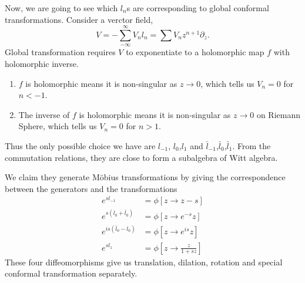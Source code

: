 \documentclass[a4paper,11pt]{article}
\begin{document}
Now, we are going to see which $l_n$s are corresponding to global conformal transformations. Consider a verctor field,
\begin{equation}
    V=-\sum_{-\infty}^\infty V_nl_n=\sum V_nz^{n+1}\partial_z.
\end{equation}
 Global transformation requires $V$ to exponentiate to a holomorphic map $f$ with holomorphic inverse.
 \begin{enumerate}
     \item $f$ is holomorphic means it is non-singular as $z\rightarrow0$, which tells us $V_n=0$ for $n<-1$.
     \item The inverse of $f$ is holomorphic means it is non-singular as $z\rightarrow0$ on Riemann Sphere, which tells us $V_n=0$ for $n>1$.
 \end{enumerate}
Thus the only possible choice we have are $l_{-1}$, $l_0$,$l_1$ and $\bar{l}_{-1}$,$\bar{l}_0$,$\bar{l}_1$. From the commutation relations, they are close to form a subalgebra of Witt algebra.

We claim they generate Möbius transformations by giving the correspondence between the generators and the transformations
\begin{equation*}
\begin{aligned}
e^{sl_{-1}}&=\phi[z\rightarrow z-s]\\
e^{s(l_0+\bar{l}_0)}&=\phi[z\rightarrow e^{-s}z]\\
e^{is(\bar{l}_0-l_0)}&=\phi[z\rightarrow e^{is}z]\\
e^{sl_1}&=\phi[z\rightarrow \frac{z}{1+sz}]
\end{aligned}
\end{equation*}
These four diffeomorphisms give us translation, dilation, rotation and special conformal transformation separately.
\end{document}
